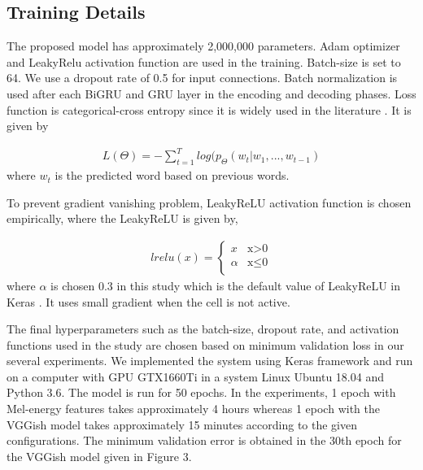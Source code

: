 \documentclass{article}
\begin{document}
\subsection{Training Details}

The proposed model has approximately 2,000,000 parameters. Adam optimizer and LeakyRelu activation function are used in the training. Batch-size is set to 64. We use a dropout rate of 0.5 for input connections. Batch normalization \cite{DBLP:journals/corr/IoffeS15} is used after each BiGRU and GRU layer in the encoding and decoding phases. Loss function is categorical-cross entropy since it is widely used in the literature \cite{tanti-etal-2017-role}. It is given by  

\begin{equation}
\begin{aligned}
L(\Theta) =- \sum_{t=1}^{T} log(p_\Theta(w_t|w_1,...,w_{t-1})
\end{aligned}
\end{equation} 
where $w_t$ is the predicted word based on previous words.

To prevent gradient vanishing problem, LeakyReLU activation function is chosen empirically, where the LeakyReLU is given by, 

\begin{equation}
\begin{aligned}
lrelu(x) =
\begin{cases}
x & \text{x$>$0}\\
\alpha & \text{x$\leq$0}\\
\end{cases} 
\end{aligned}
\end{equation}
 where $\alpha$ is chosen 0.3 in this study which is the default value of LeakyReLU in Keras \cite{keras}. It uses small gradient when the cell is not active.
 
The final hyperparameters such as the batch-size, dropout rate, and activation functions used in the study are chosen based on minimum validation loss in our several experiments. We implemented the system using Keras framework and run on a computer with GPU GTX1660Ti in a system Linux Ubuntu 18.04 and Python 3.6. The model is run for 50 epochs. In the experiments, 1 epoch with Mel-energy features takes approximately 4 hours whereas 1 epoch with the VGGish model takes approximately 15 minutes according to the given configurations. The minimum validation error is obtained in the 30th epoch for the VGGish model given in Figure 3.
\end{document}
